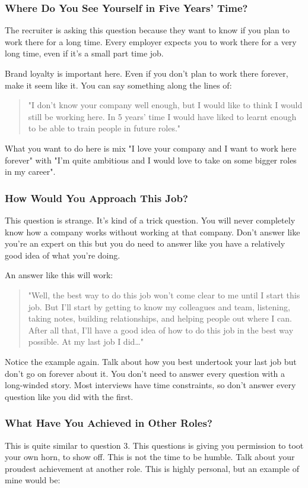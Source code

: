 \documentclass{article}
\begin{document}
\subsubsection{Where Do You See Yourself in Five Years' Time?}
The recruiter is asking this question because they want to know if you
plan to work there for a long time. Every employer expects you to work
there for a very long time, even if it's a small part time job.

Brand loyalty is important here. Even if you don't plan to work there
forever, make it seem like it. You can say something along the lines of:

\begin{quote}
    "I don't know your company well enough, but I would like to think I
would still be working here. In 5 years' time I would have liked to
learnt enough to be able to train people in future roles."
\end{quote}
What you want to do here is mix "I love your company and I want to work
here forever" with "I'm quite ambitious and I would love to take on some
bigger roles in my career".
\subsubsection{How Would You Approach This Job?}
This question is strange. It's kind of a trick question. You will never
completely know how a company works without working at that company.
Don't answer like you're an expert on this but you do need to answer
like you have a relatively good idea of what you're doing.

An answer like this will work:
\begin{quote}
    "Well, the best way to do this job won't come clear to me until I start
this job. But I'll start by getting to know my colleagues and team,
listening, taking notes, building relationships, and helping people out
where I can. After all that, I'll have a good idea of how to do this job
in the best way possible. At my last job I did\ldots"
\end{quote}
Notice the example again. Talk about how you best undertook your last
job but don't go on forever about it. You don't need to answer every
question with a long-winded story. Most interviews have time
constraints, so don't answer every question like you did with the first.
\subsubsection{What Have You Achieved in Other Roles?}
This is quite similar to question 3. This questions is giving you
permission to toot your own horn, to show off. This is not the time to
be humble. Talk about your proudest achievement at another role. This is
highly personal, but an example of mine would be:
\end{document}
